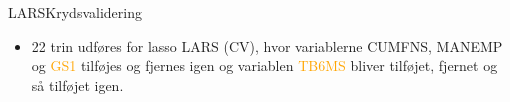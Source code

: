 \begin{frame}{LARS}{Krydsvalidering}
\begin{table}
\center
{}
\caption{Værdien af $f_{\min}$ og $f_{1\text{sd}}$, gennemsnitlig krydsvalideringsfejl, som er målt i MSE, antallet af parametre, justeret R$^2$ og log-likelihood for LARS og lasso LARS. De valgte tuning parametre er markeret med tykt.} \label{tab:lars_lasso_tab}
\end{table}
\begin{itemize}
\item 22 trin udføres for lasso LARS (CV), hvor variablerne \textcolor{chartreuse4}{CUMFNS}, \textcolor{blue3}{MANEMP} og \textcolor{orange}{GS1} tilføjes og fjernes igen og 
variablen \textcolor{orange}{TB6MS} bliver tilføjet, fjernet og så tilføjet igen.  
\end{itemize}
\end{frame}


